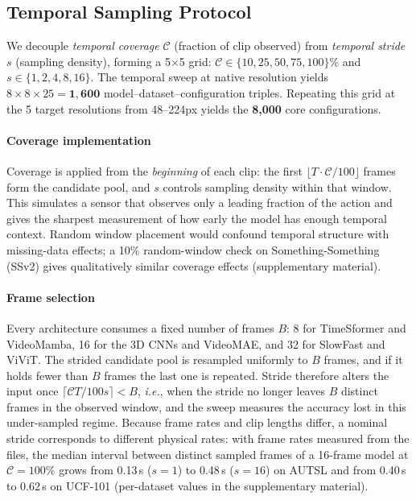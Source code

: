 \documentclass[a4paper, 10pt, conference]{ieeeconf}
\begin{document}
\subsection{Temporal Sampling Protocol}

We decouple \textit{temporal coverage} $\mathcal{C}$ (fraction of clip observed) from \textit{temporal stride} $s$ (sampling density), forming a 5$\times$5 grid: $\mathcal{C}\in\{10,25,50,75,100\}\%$ and $s\in\{1,2,4,8,16\}$. The temporal sweep at native resolution yields $8{\times}8{\times}25{=}\mathbf{1{,}600}$ model--dataset--configuration triples. Repeating this grid at the 5 target resolutions from 48--224px yields the \textbf{8,000} core configurations.

\paragraph{Coverage implementation}
Coverage is applied from the \emph{beginning} of each clip: the first $\lfloor T\cdot\mathcal{C}/100\rfloor$ frames form the candidate pool, and $s$ controls sampling density within that window. This simulates a sensor that observes only a leading fraction of the action and gives the sharpest measurement of how early the model has enough temporal context. Random window placement would confound temporal structure with missing-data effects; a 10\% random-window check on Something-Something (SSv2) gives qualitatively similar coverage effects (supplementary material).

\paragraph{Frame selection}
Every architecture consumes a fixed number of frames $B$: 8 for TimeSformer and VideoMamba, 16 for the 3D CNNs and VideoMAE, and 32 for SlowFast and ViViT. The strided candidate pool is resampled uniformly to $B$ frames, and if it holds fewer than $B$ frames the last one is repeated. Stride therefore alters the input once $\lceil \mathcal{C}T/100s\rceil<B$, \emph{i.e.}, when the stride no longer leaves $B$ distinct frames in the observed window, and the sweep measures the accuracy lost in this under-sampled regime. Because frame rates and clip lengths differ, a nominal stride corresponds to different physical rates: with frame rates measured from the files, the median interval between distinct sampled frames of a 16-frame model at $\mathcal{C}{=}100\%$ grows from 0.13\,s ($s{=}1$) to 0.48\,s ($s{=}16$) on AUTSL and from 0.40\,s to 0.62\,s on UCF-101 (per-dataset values in the supplementary material).
\end{document}
